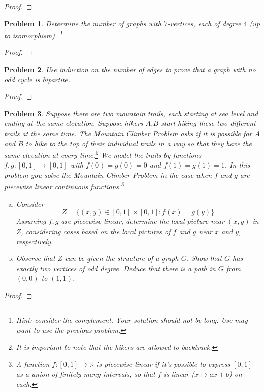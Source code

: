 \documentclass[11pt]{article}
\newtheorem{problem}{Problem}
\begin{document}
\begin{proof}

\end{proof}

\begin{problem}
Determine the number of graphs with $7$-vertices, each of degree $4$ (up to isomorphism). \footnote{Hint: consider the complement. Your solution should not be long. Use may want to use the previous problem.} 
\end{problem}

\begin{proof}

\end{proof}

\begin{problem}
Use induction on the number of edges to prove that a graph with no odd cycle is bipartite. 
\end{problem}


\begin{proof}

\end{proof}

\begin{problem}
Suppose there are two mountain trails, each starting at sea level and ending at the same elevation. Suppose hikers $A$,$B$ start hiking these two different trails at the same time. The Mountain Climber Problem asks if it is possible for $A$ and $B$ to hike to the top of their individual trails in a way so that they have the same elevation at every time.\footnote{It is important to note that the hikers are allowed to backtrack.} We model the trails by functions $f,g:[0,1]\rightarrow[0,1]$ with $f(0)=g(0)=0$ and $f(1)=g(1)=1$. In this problem you solve the Mountain Climber Problem in the case when $f$ and $g$ are piecewise linear continuous functions.\footnote{A function $f:[0,1]\rightarrow\mathbb R$ is piecewise linear if it's possible to express $[0,1]$ as a union of finitely many intervals, so that $f$ is linear ($x\mapsto ax+b$) on each. }
\begin{enumerate}[(a)]
\item Consider \[Z=\{(x,y)\in[0,1]\times[0,1]: f(x)=g(y)\}\]
Assuming $f,g$ are piecewise linear, determine the local picture near $(x,y)$ in $Z$, considering cases based on the local pictures of $f$ and $g$ near $x$ and $y$, respectively.
\item Observe that $Z$ can be given the structure of a graph $G$. Show that $G$ has exactly two vertices of odd degree. Deduce that there is a path in $G$ from $(0,0)$ to $(1,1)$.
\end{enumerate} 
\end{problem}

\begin{proof}

\end{proof}
\end{document}
